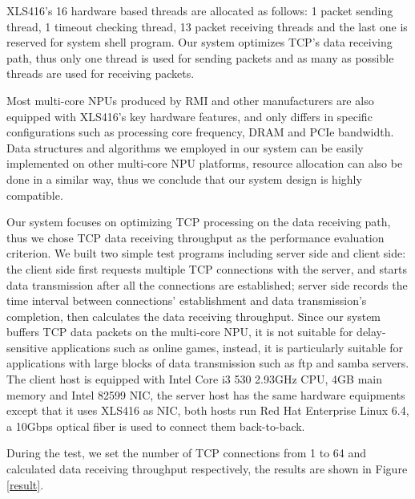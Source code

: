 \documentclass[conference]{IEEEtran}
\begin{document}
XLS416's 16 hardware based threads are allocated as follows: 1 packet sending thread, 1 timeout checking thread, 13 packet receiving threads and the last one is reserved for system shell program. Our system optimizes TCP's data receiving path, thus only one thread is used for sending packets and as many as possible threads are used for receiving packets.

Most multi-core NPUs produced by RMI and other manufacturers are also equipped with XLS416's key hardware features, and only differs in specific configurations such as processing core frequency, DRAM and PCIe bandwidth. Data structures and algorithms we employed in our system can be easily implemented on other multi-core NPU platforms, resource allocation can also be done in a similar way, thus we conclude that our system design is highly compatible.

Our system focuses on optimizing TCP processing on the data receiving path, thus we chose TCP data receiving throughput as the performance evaluation criterion. We built two simple test programs including server side and client side: the client side first requests multiple TCP connections with the server, and starts data transmission after all the connections are established; server side records the time interval between connections' establishment and data transmission's completion, then calculates the data receiving throughput. Since our system buffers TCP data packets on the multi-core NPU, it is not suitable for delay-sensitive applications such as online games, instead, it is particularly suitable for applications with large blocks of data transmission such as ftp and samba servers. The client host is equipped with Intel Core i3 530 2.93GHz CPU, 4GB main memory and Intel 82599 NIC, the server host has the same hardware equipments except that it uses XLS416 as NIC, both hosts run Red Hat Enterprise Linux 6.4, a 10Gbps optical fiber is used to connect them back-to-back.

During the test, we set the number of TCP connections from 1 to 64 and calculated data receiving throughput respectively, the results are shown in Figure \ref{result}.
\end{document}
